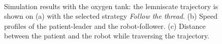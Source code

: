 \documentclass[journal]{IEEEtran}
\begin{document}
\begin{figure} 
    \centering
  \\
    \hspace*{-1.5em}
    \vspace*{-1.1em}
    \hspace*{-1.5em}
    \vspace*{1.1em}
  \caption{Simulation results with the oxygen tank: the lemniscate trajectory is shown on (a) with the selected strategy \textit{Follow the thread}. (b) Speed profiles of the patient-leader and the robot-follower. (c) Distance between the patient and the robot while traversing the trajectory.}
  \label{fig:validationwithtank} 
\end{figure}
\end{document}
